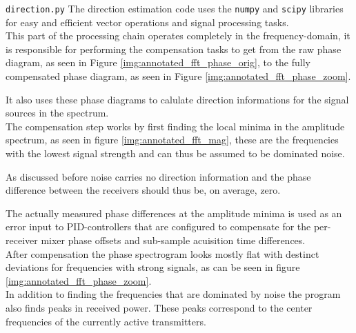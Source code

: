 \begin{subchapter}{\texttt{direction.py}}
  The direction estimation code uses the \texttt{numpy} and
  \texttt{scipy} libraries for easy and efficient
  vector operations and signal processing tasks. \\

  This part of the processing chain operates completely
  in the frequency-domain, it is responsible for
  performing the compensation tasks to get from the
  raw phase diagram, as seen in Figure \ref{img:annotated_fft_phase_orig},
  to the fully compensated phase diagram,
  as seen in Figure \ref{img:annotated_fft_phase_zoom}.

  It also uses these phase diagrams to calulate direction informations
  for the signal sources in the spectrum. \\

  The compensation step works by first finding the local minima in
  the amplitude spectrum, as seen in figure \ref{img:annotated_fft_mag},
  these are the frequencies with the lowest signal strength
  and can thus be assumed to be dominated noise.

  As discussed before noise carries no direction
  information and the phase difference between the
  receivers should thus be, on average, zero.

  The actually measured phase differences at the amplitude minima
  is used as an error input to PID-controllers that
  are configured to compensate for the per-receiver
  mixer phase offsets and sub-sample acuisition
  time differences. \\

  After compensation the phase spectrogram looks mostly
  flat with destinct deviations for frequencies
  with strong signals, as can be seen in
  figure \ref{img:annotated_fft_phase_zoom}. \\

  In addition to finding the frequencies that are dominated
  by noise the program also finds peaks in received power.
  These peaks correspond to the center frequencies of the currently active
  transmitters.
\end{subchapter}
